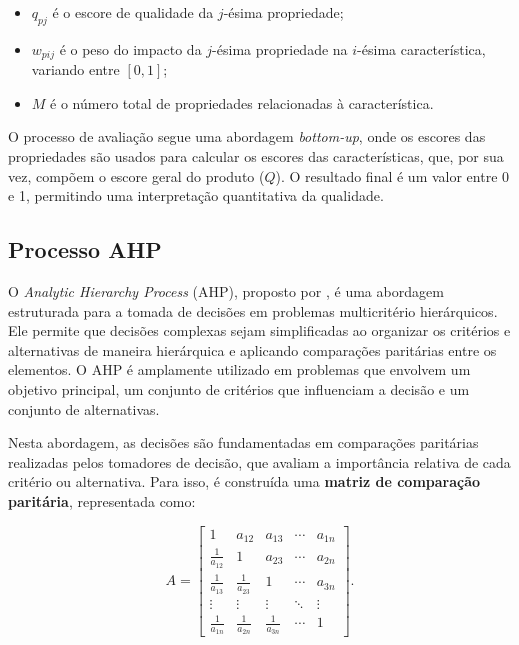\begin{itemize}
    \item \( q_{pj} \) é o escore de qualidade da \( j \)-ésima propriedade;
    \item \( w_{pij} \) é o peso do impacto da \( j \)-ésima propriedade na \( i \)-ésima característica, variando entre \([0,1]\);
    \item \( M \) é o número total de propriedades relacionadas à característica.
\end{itemize}

O processo de avaliação segue uma abordagem \textit{bottom-up}, onde os escores das propriedades são usados para calcular os escores das características, que, por sua vez, compõem o escore geral do produto (\( Q \)). O resultado final é um valor entre 0 e 1, permitindo uma interpretação quantitativa da qualidade.

\subsection{Processo AHP}
\label{subsec:ahp}

O \textit{Analytic Hierarchy Process} (AHP), proposto por , é uma abordagem estruturada para a tomada de decisões em problemas multicritério hierárquicos. Ele permite que decisões complexas sejam simplificadas ao organizar os critérios e alternativas de maneira hierárquica e aplicando comparações paritárias entre os elementos. O AHP é amplamente utilizado em problemas que envolvem um objetivo principal, um conjunto de critérios que influenciam a decisão e um conjunto de alternativas.

Nesta abordagem, as decisões são fundamentadas em comparações paritárias realizadas pelos tomadores de decisão, que avaliam a importância relativa de cada critério ou alternativa. Para isso, é construída uma \textbf{matriz de comparação paritária}, representada como:

\[
A = 
\begin{bmatrix}
    1 & a_{12} & a_{13} & \cdots & a_{1n} \\
    \frac{1}{a_{12}} & 1 & a_{23} & \cdots & a_{2n} \\
    \frac{1}{a_{13}} & \frac{1}{a_{23}} & 1 & \cdots & a_{3n} \\
    \vdots & \vdots & \vdots & \ddots & \vdots \\
    \frac{1}{a_{1n}} & \frac{1}{a_{2n}} & \frac{1}{a_{3n}} & \cdots & 1
\end{bmatrix}.
\]

